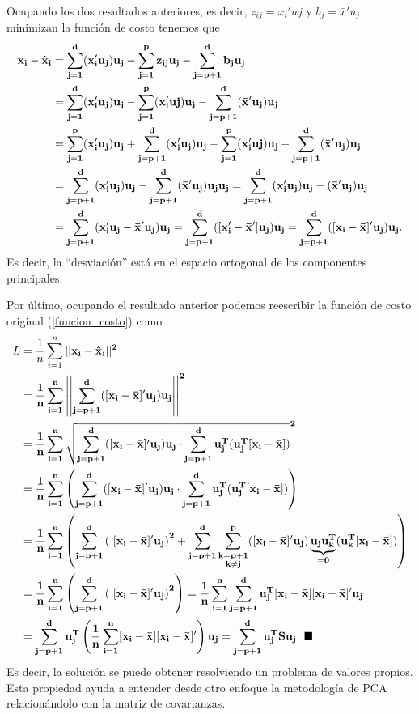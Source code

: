 \documentclass[paper=letter, fontsize=11pt]{scrartcl}
\numberwithin{equation}{section} %
\numberwithin{figure}{section} %
\numberwithin{table}{section} %
\begin{document}
Ocupando los dos resultados anteriores, es decir, $z_{ij}=x_i'uj$ y $b_{j}=\bar{x}'u_j$ minimizan la función de costo tenemos que 
\begin{align*}
    \bf x_i-\hat{x}_i&= \bf \sum_{j=1}^d (x_i'u_j)u_j-\sum_{j=1}^p z_{ij}u_j-\sum_{j=p+1}^d b_j u_j\\
    &\bf =\sum_{j=1}^d (x_i'u_j)u_j-\sum_{j=1}^p (x_i'uj)u_j-\sum_{j=p+1}^d(\bar{x}'u_j) u_j\\
    &\bf =\sum_{j=1}^p (x_i'u_j)u_j+\sum_{j=p+1}^d (x_i'u_j)u_j-\sum_{j=1}^p (x_i'uj)u_j-\sum_{j=p+1}^d(\bar{x}'u_j) u_j\\
    &\bf = \sum_{j=p+1}^d (x_i'u_j)u_j-\sum_{j=p+1}^d(\bar{x}'u_j)u_j u_j=\sum_{j=p+1}^d (x_i'u_j)u_j-(\bar{x}'u_j)u_j\\
    &\bf =\sum_{j=p+1}^d (x_i'u_j-\bar{x}'u_j)u_j=\sum_{j=p+1}^d ([x_i'-\bar{x}']u_j)u_j=\sum_{j=p+1}^d ([x_i-\bar{x}]'u_j)u_j.
\end{align*}
Es decir, la “desviación” está en el espacio ortogonal de los componentes principales.

Por último, ocupando el resultado anterior podemos reescribir la función de costo original (\ref{funcion_costo}) como
\begin{align*}
    L&=\frac{1}{n} \sum_{i=1}^n \bf ||x_i-\hat{x}_i||^2\\
    &=\bf \frac{1}{n} \sum_{i=1}^n \bf \left|\left| \sum_{j=p+1}^d ([x_i-\bar{x}]'u_j)u_j\right|\right|^2\\
    &= \bf \frac{1}{n} \sum_{i=1}^n \bf \sqrt{\sum_{j=p+1}^d ([x_i-\bar{x}]'u_j)u_j \cdot \sum_{j=p+1}^d u_j^T(u_j^T[x_i-\bar{x}])}^2\\
    &= \bf \frac{1}{n} \sum_{i=1}^n \bf \left( \sum_{j=p+1}^d ([x_i-\bar{x}]'u_j)u_j \cdot \sum_{j=p+1}^d u_j^T(u_j^T[x_i-\bar{x}])\right)\\
    &= \bf \frac{1}{n} \sum_{i=1}^n\left( \sum_{j=p+1}^d \left(\ [x_i-\bar{x}]'u_j\right)^2+\sum_{j=p+1}^d\sum_{\substack{\bf k=p+1\\ \bf k\neq j}}^p ([x_i-\bar{x}]'u_j)\underbrace{\bf u_j u_k^T}_{=0}(u_k^T[x_i-\bar{x}])\right)\\
    &= \bf \frac{1}{n} \sum_{i=1}^n\left( \sum_{j=p+1}^d \left(\ [x_i-\bar{x}]'u_j\right)^2\right) = \bf \frac{1}{n} \sum_{i=1}^n \sum_{j=p+1}^d  u_j^T[x_i-\bar{x}][x_i-\bar{x}]'u_j\\
    &= \bf \sum_{j=p+1}^d  u_j^T\left(\frac{1}{n} \sum_{i=1}^n[x_i-\bar{x}][x_i-\bar{x}]'\right)u_j = \bf \sum_{j=p+1}^d  u_j^TSu_j \ \ \blacksquare
\end{align*}
Es decir, la solución se puede obtener resolviendo un problema de valores propios. Esta propiedad ayuda a entender desde otro enfoque la metodología de PCA relacionándolo con la matriz de covarianzas. 
\end{document}
